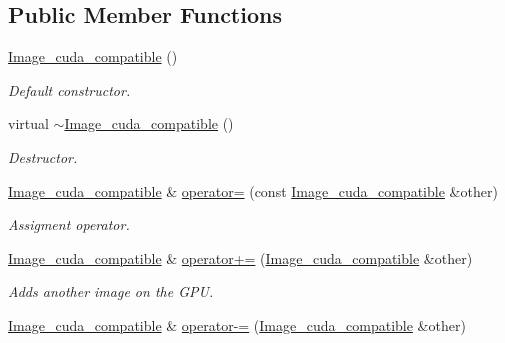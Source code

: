 \subsection*{Public Member Functions}
\begin{DoxyCompactItemize}
\item 
\hyperlink{classImage__cuda__compatible_acd647640958be8fb9d24f579a5f7aba6}{Image\+\_\+cuda\+\_\+compatible} ()
\begin{DoxyCompactList}\small\item\em Default constructor. \end{DoxyCompactList}\item 
virtual \hyperlink{classImage__cuda__compatible_af56f09a54e75a489f59d8575ace49c9e}{$\sim$\+Image\+\_\+cuda\+\_\+compatible} ()\hypertarget{classImage__cuda__compatible_af56f09a54e75a489f59d8575ace49c9e}{}\label{classImage__cuda__compatible_af56f09a54e75a489f59d8575ace49c9e}

\begin{DoxyCompactList}\small\item\em Destructor. \end{DoxyCompactList}\item 
\hyperlink{classImage__cuda__compatible}{Image\+\_\+cuda\+\_\+compatible} \& \hyperlink{classImage__cuda__compatible_a151b964c26eaefbad2a77fd733321ba8}{operator=} (const \hyperlink{classImage__cuda__compatible}{Image\+\_\+cuda\+\_\+compatible} \&other)\hypertarget{classImage__cuda__compatible_a151b964c26eaefbad2a77fd733321ba8}{}\label{classImage__cuda__compatible_a151b964c26eaefbad2a77fd733321ba8}

\begin{DoxyCompactList}\small\item\em Assigment operator. \end{DoxyCompactList}\item 
\hyperlink{classImage__cuda__compatible}{Image\+\_\+cuda\+\_\+compatible} \& \hyperlink{classImage__cuda__compatible_aaba8e16b5ab9064502f1a18ad36acdbc}{operator+=} (\hyperlink{classImage__cuda__compatible}{Image\+\_\+cuda\+\_\+compatible} \&other)
\begin{DoxyCompactList}\small\item\em Adds another image on the G\+PU. \end{DoxyCompactList}\item 
\hyperlink{classImage__cuda__compatible}{Image\+\_\+cuda\+\_\+compatible} \& \hyperlink{classImage__cuda__compatible_a33ba9942734b6595c75f6e7be54dc975}{operator-\/=} (\hyperlink{classImage__cuda__compatible}{Image\+\_\+cuda\+\_\+compatible} \&other)\hypertarget{classImage__cuda__compatible_a33ba9942734b6595c75f6e7be54dc975}{}\label{classImage__cuda__compatible_a33ba9942734b6595c75f6e7be54dc975}


\end{DoxyCompactItemize}
